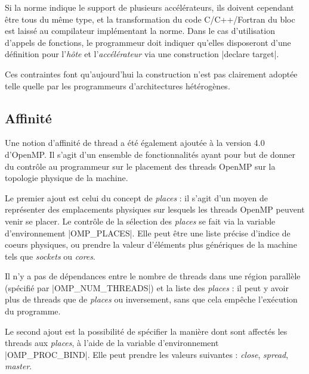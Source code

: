 Si la norme indique le support de plusieurs accélérateurs, ils doivent cependant être tous du même type, et la transformation du code C/C++/Fortran du bloc est laissé au compilateur implémentant la norme.
Dans le cas d'utilisation d'appels de fonctions, le programmeur doit indiquer qu'elles disposeront d'une définition pour l'\emph{hôte} et l'\emph{accélérateur} via une construction |declare target|.

Ces contraintes font qu'aujourd'hui la construction n'est pas clairement adoptée telle quelle par les programmeurs d'architectures hétérogènes.

\subsection{Affinité}

Une notion d'affinité de thread a été également ajoutée à la version 4.0 d'OpenMP.
Il s'agit d'un ensemble de fonctionnalités ayant pour but de donner du contrôle au programmeur sur le placement des threads OpenMP sur la topologie physique de la machine.

Le premier ajout est celui du concept de \emph{places} : il s'agit d'un moyen de représenter des emplacements physiques sur lesquels les threads OpenMP peuvent venir se placer.
Le contrôle de la sélection des \emph{places} se fait via la variable d'environnement |OMP_PLACES|.
Elle peut être une liste précise d'indice de coeurs physiques, ou prendre la valeur d'éléments plus génériques de la machine tels que \emph{sockets} ou \emph{cores}.

Il n'y a pas de dépendances entre le nombre de threads dans une région parallèle (spécifié par |OMP_NUM_THREADS|) et la liste des \emph{places} : il peut y avoir plus de threads que de \emph{places} ou inversement, sans que cela empêche l'exécution du programme.

Le second ajout est la possibilité de spécifier la manière dont sont affectés les threads aux \emph{places}, à l'aide de la variable d'environnement |OMP_PROC_BIND|.
Elle peut prendre les valeurs suivantes : \emph{close}, \emph{spread}, \emph{master}.

\begin{todo}
\end{todo}

